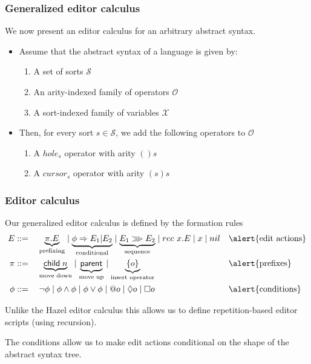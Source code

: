 \documentclass[t,24pt,serif,aspectratio=169]{beamer}
\begin{document}
\begin{frame}
  \frametitle{Generalized editor calculus}

  We now present an editor calculus for an arbitrary abstract syntax.
  
    \begin{itemize}
        \item Assume that the abstract syntax of a language is given by:
              \begin{enumerate}
                  \item A set of sorts $\mathcal{S}$
                  \item An arity-indexed family of operators $\mathcal{O}$
                  \item A sort-indexed family of variables $\mathcal{X}$
              \end{enumerate}
        \item Then, for every sort $s \in \mathcal{S}$, we add the following operators to $\mathcal{O}$
              \begin{enumerate}
                  \item A $hole_s$ operator with arity $()s$
                  \item A $cursor_s$ operator with arity $(s)s$
              \end{enumerate}
    \end{itemize}
\end{frame}

\begin{frame}
  \frametitle{Editor calculus}

  Our generalized editor calculus is defined by the formation rules
    \[
        \begin{aligned}
            E    & ::= \quad \underbrace{\pi.E}_{\text{prefixing}} \mid \underbrace{\phi \Rightarrow E_1|E_2}_{\text{conditional}} \mid
            \underbrace{E_1 \ggg E_2}_{\text{sequence}} \mid rec \ x.E \mid x \mid nil      &  &
            \text{\alert{edit actions}}\\
            \pi  & ::= \quad \underbrace{\textsf{child}\; n}_{\text{move down}} 
            \mid \underbrace{\textsf{parent}}_{\text{move up}} \mid
            \underbrace{\{ o \}}_{\text{insert operator}}                                                          &  & \text{\alert{prefixes}}\\
            \phi & ::= \quad \neg \phi \mid\phi \land \phi \mid\phi
            \lor \phi \mid @o \mid \Diamond o \mid\square o && \text{\alert{conditions}}
        \end{aligned}
      \]

Unlike the Hazel editor calculus this allows us to define
repetition-based editor scripts (using recursion).

The conditions allow us to make edit actions conditional on the shape
of the abstract syntax tree.

\end{frame}
\end{document}
